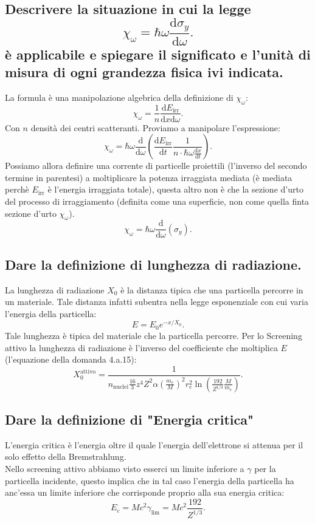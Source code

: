 \subsection[\hspace{1mm} ]{Descrivere la situazione in cui la legge
\[
	\chi_{\omega} = \hbar \omega \frac{\text{d}\sigma_{y}}{\text{d}\omega}
.\] 
 è applicabile e spiegare il significato e l'unità di misura di ogni grandezza fisica ivi indicata.
}\label{sec:4.a.16}
La formula è una manipolazione algebrica della definizione di $\chi_{\omega}$:
\[
	\chi_{\omega}= \frac{1}{n} \frac{\mbox{d} E_{\text{irr}}}{\mbox{d} x \text{d}\omega} 
.\] 
Con $n$ densità dei centri scatteranti. Proviamo a manipolare l'espressione:
\[
	\chi_{\omega} = \hbar \omega\frac{\mbox{d}}{\mbox{d} \omega} \left( \frac{\mbox{d}E_{\text{irr}}}{\mbox{d}t}\frac{1}{n\cdot \hbar \omega \frac{\mbox{d} x}{\mbox{d} t} } \right)  
.\] 
Possiamo allora definire una corrente di particelle proiettili (l'inverso del secondo termine in parentesi) a moltiplicare la potenza irraggiata mediata (è mediata perchè $E_{\text{irr}}$ è l'energia irraggiata totale), questa altro non è che la sezione d'urto del processo di irraggiamento (definita come una superficie, non come quella finta sezione d'urto $\chi_{\omega}$).
\[
	\chi_{\omega}= \hbar \omega \frac{\mbox{d} }{\mbox{d} \omega} \left( \sigma_{y} \right) 
.\] 
\subsection[\hspace{1mm} ]{Dare la definizione di lunghezza di radiazione.
}\label{sec:4.a.17}
La lunghezza di radiazione $X_0$ è la distanza tipica che una particella percorre in un materiale. Tale distanza infatti subentra nella legge esponenziale con cui varia l'energia della particella:
\[
	E = E_0 e^{-x /X_0}
.\] 
Tale lunghezza è tipica del materiale che la particella percorre. Per lo Screening attivo la lunghezza di radiazione è l'inverso del coefficiente che moltiplica $E$ (l'equazione della domanda 4.a.15):
\[
	X_0^{\text{attivo}} = \frac{1}{n_{\text{nuclei}}\frac{16}{3}z^4Z^2\alpha\left(\frac{m_e}{M}\right)^2r_e^2\ln\left(\frac{192}{Z^{1 /3}}\frac{M}{m_e}\right)} 
.\] 

\subsection[\hspace{1mm} ]{Dare la definizione di "Energia critica"
}\label{sec:4.a.18}
L'energia critica è l'energia oltre il quale l'energia dell'elettrone si attenua per il solo effetto della Bremstrahlung.\\
Nello screening attivo abbiamo visto esserci un limite inferiore a $\gamma$ per la particella incidente, questo implica che in tal caso l'energia della particella ha anc'essa un limite inferiore che corrisponde proprio alla sua energia critica:
\[
	E_{c} = Mc^2\gamma_{\text{lim}}= Mc^2 \frac{192}{Z^{1 /3}}
.\] 
